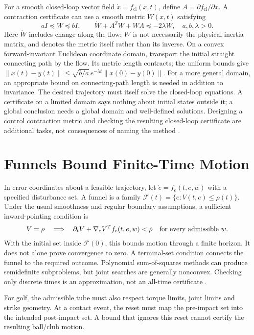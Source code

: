 For a smooth closed-loop vector field $\dot x=f_{\mathrm{cl}}(x,t)$, define
$A=\partial f_{\mathrm{cl}}/\partial x$. A contraction certificate can use a
smooth metric $W(x,t)$ satisfying
\[
 aI\preceq W\preceq bI,\qquad
 \dot W+A^TW+WA\preceq-2\lambda W,
 \quad a,b,\lambda>0.
\]
Here $\dot W$ includes change along the flow; $W$ is not necessarily the physical
inertia matrix, and denotes the metric itself rather than its inverse.
On a convex forward-invariant Euclidean coordinate domain, transport the initial
straight connecting path by the flow. Its metric length contracts; the uniform
bounds give $\|x(t)-y(t)\|\le\sqrt{b/a}\,e^{-\lambda t}\|x(0)-y(0)\|$.
For a more general domain, an appropriate bound on connecting-path length is
needed in addition to invariance. The desired
trajectory must itself solve the closed-loop equations. A certificate on a
limited domain says nothing about initial states outside it; a global conclusion
needs a global domain and well-defined solutions. Designing a control
contraction metric and checking the resulting closed-loop certificate are
additional tasks, not consequences of naming the method
\cite{LohmillerSlotine1998}.

\section{Funnels Bound Finite-Time Motion}

In error coordinates about a feasible trajectory, let
$\dot e=f_e(t,e,w)$ with a specified disturbance set. A funnel is a family
$\mathcal F(t)=\{e:V(t,e)\le\rho(t)\}$. Under the usual smoothness and regular
boundary assumptions, a sufficient inward-pointing condition is
\[
 V=\rho\quad\Longrightarrow\quad
 \partial_tV+\nabla_eV^Tf_e(t,e,w)<\dot\rho
 \quad\hbox{for every admissible }w.
\]
With the initial set inside $\mathcal F(0)$, this bounds motion through a finite
horizon. It does not alone prove convergence to zero. A terminal-set condition
connects the funnel to the required outcome. Polynomial sum-of-squares methods
can produce semidefinite subproblems, but joint searches are generally nonconvex.
Checking only discrete times is an approximation, not an all-time certificate
\cite{MajumdarTedrake2017,TedrakeFunnelReview}.

For golf, the admissible tube must also respect torque limits, joint limits and
strike geometry. At a contact event, the reset must map the pre-impact set into
the intended post-impact set. A bound that ignores this reset cannot certify
the resulting ball/club motion.

